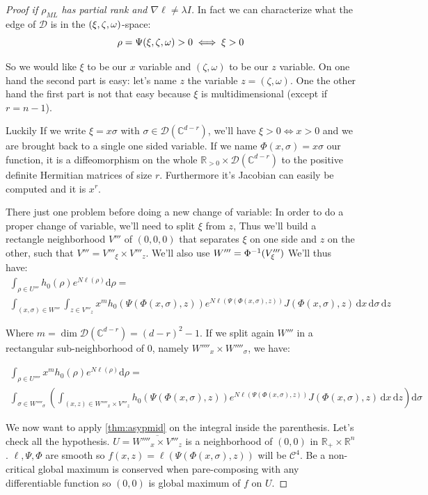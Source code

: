 \documentclass[10pt,a4paper]{report}
\theoremstyle{plain}
\theoremstyle{definition}
\theoremstyle{remark}
\newcommand{\R}{\ensuremath{\mathbb{R}}}
\newcommand{\C}{\ensuremath{\mathbb{C}}}
\newcommand{\dd}{\mathrm{d}}
\newcommand{\class}[1]{{\mathscr{C}^{#1}}}
\newcommand{\ml}{_{M\!L}}
\begin{document}
\begin{proof}[Proof if $\rho\ml$ has partial rank and $\nabla \ell \neq \lambda I$]
  In fact we can characterize what the edge of $\mathcal{D}$ is in the
  $(\xi,\zeta,\omega)$-space:
  \[\rho = \Psi(\xi,\zeta,\omega) > 0 \iff \xi >0\]

  So we would like $\xi$ to be our $x$ variable and $(\zeta,\omega)$ to be our
  $z$ variable. On one hand the second part is easy: let's name $z$ the variable
  $z = (\zeta,\omega)$. One the other hand the first part is not that easy
  because $\xi$ is multidimensional (except if $r = n-1$).

  Luckily If we write $\xi = x \sigma$ with $\sigma \in \mathcal{D}(\C^{d-r})$,
  we'll have $\xi > 0 \iff x > 0$ and we are brought back to a single one sided
  variable. If we name $\Phi(x,\sigma) = x \sigma$ our function, it is a
  diffeomorphism on the whole $\R_{>0} \times \mathcal{D}(\C^{d-r})$ to the positive
  definite Hermitian matrices of size $r$. Furthermore it's Jacobian can easily
  be computed and it is $x^r$.

  There just one problem before doing a new change
  of variable: In order to do a proper change of variable, we'll
  need to split $\xi$ from $z$, Thus we'll build a rectangle
  neighborhood $V'''$ of
  $(0,0,0)$ that separates $\xi$ on one side and $z$ on the other,
  such that $V''' = V'''_\xi \times V'''_z$.
  We'll also use $W''' = \Phi^{-1}(V'''_\xi)$ We'll thus have:
  \newcommand{\ppvars}{\Psi(\Phi(x,\sigma),z)}
  \newcommand{\pvvars}{(\Phi(x,\sigma),z)}
  \newcommand{\pdvars}{\dd x\, \dd \sigma\, \dd z}
  \begin{multline}
    \int_{\rho \in U'''} h_0(\rho)e^{N\ell(\rho)}\dd \rho =\\
    \int_{(x,\sigma) \in W'''}\int_{z \in V'''_z} x^m h_0(\ppvars)e^{N\ell(\ppvars)}J\pvvars
    \,\pdvars
  \end{multline}

  Where $m = \dim \mathcal{D}(\C^{d-r}) = (d-r)^2 -1$.
  If we split again $W'''$ in a rectangular sub-neighborhood of $0$, namely $W''''_x \times
  W''''_\sigma$, we have:

  \begin{multline}
    \int_{\rho \in U''''} x^m h_0(\rho)e^{N\ell(\rho)}\dd \rho =\\
    \int_{\sigma \in W''''_\sigma}\left(  \int_{(x,z) \in W''''_x \times V'''_z}
      h_0(\ppvars)e^{N\ell(\ppvars)}J\pvvars \,\dd x \, \dd z
    \right) \dd \sigma
  \end{multline}

  We now want to apply \cref{thm:asypmid} on the integral inside the
  parenthesis. Let's check all the hypothesis. $U = \overline{W''''_x \times
    V'''_z}$ is a neighborhood of $(0,0)$ in $\R_+ \times \R^n$.
  $\ell, \Psi, \Phi$ are smooth so
  $f(x,z) = \ell(\ppvars)$ will be $\class 4$. Be a non-critical global maximum
  is conserved when pare-composing with any differentiable function so $(0,0)$ is global maximum
  of $f$ on $U$.


\end{proof}
\end{document}

